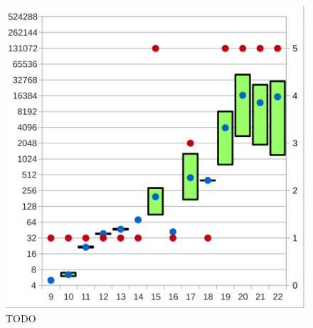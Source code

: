 \begin{figure}[!h]
\begin{minipage}[c]{0.45\textwidth}
  \includegraphics[scale=0.55]{images/data_modul_xor}
  \end{minipage}
  \caption{TODO}
  \label{fig:data_modul}
\end{figure}